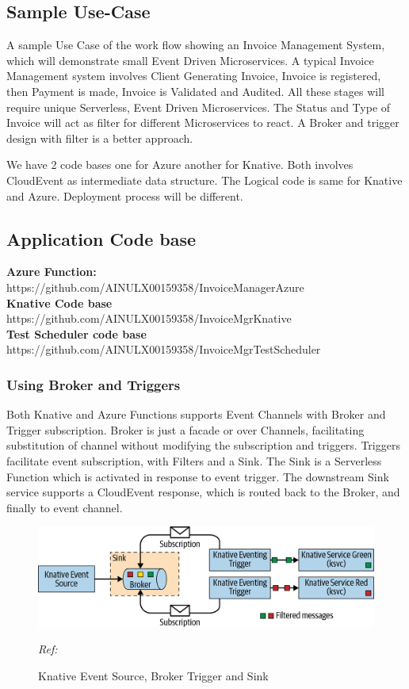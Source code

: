 \documentclass[12pt]{article}
\begin{document}
\begin{flushleft}
\section{Sample Use-Case}
A sample Use Case of the work flow showing an Invoice Management System, which will demonstrate small Event Driven Microservices. A typical Invoice Management system involves Client Generating Invoice, Invoice is registered, then Payment is made, Invoice is Validated and Audited. All these stages will require unique Serverless, Event Driven Microservices. The Status and Type of Invoice will act as filter for different Microservices to react. A Broker and trigger design with filter is a better approach.

We have 2 code bases one for Azure another for Knative. Both involves CloudEvent as intermediate data structure. The Logical code is same for Knative and Azure. Deployment process will be different. 

\subsection{Application Code base}
\textbf{Azure Function:}\\
https://github.com/AINULX00159358/InvoiceManagerAzure \\
\textbf{Knative Code base}\\ 
https://github.com/AINULX00159358/InvoiceMgrKnative\\
\textbf{Test Scheduler code base}\\ https://github.com/AINULX00159358/InvoiceMgrTestScheduler\\
\pagebreak
\subsubsection{Using Broker and Triggers}
Both Knative and Azure Functions supports Event Channels with Broker and Trigger subscription.
Broker is just a facade or over Channels, facilitating substitution of channel without modifying the subscription and triggers.
Triggers facilitate event subscription, with Filters and a Sink. The Sink is a Serverless Function which is activated in response to event trigger.
The downstream Sink service supports a CloudEvent response, which is routed back to the Broker, and finally to event channel. 
\begin{figure}[h]
    \centering
    \includegraphics[width=1.00\linewidth]{images/knative-event-broker.png}
    \caption{Knative Event Source, Broker Trigger and Sink}
    \textit{
    Ref: \cite{Sutter_Sampath_2020}}


\end{figure}
\end{flushleft}
\end{document}
